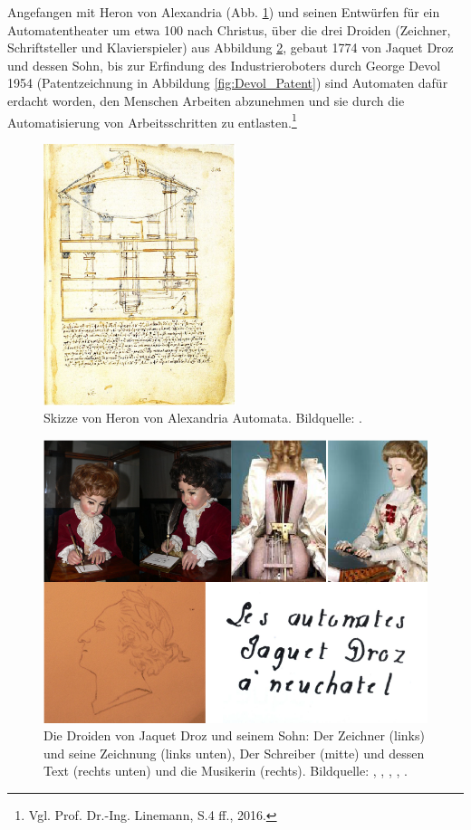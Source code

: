 Angefangen mit Heron von Alexandria (Abb. \ref{fig:Automata}) und seinen Entwürfen für ein Automatentheater um etwa 100 nach Christus, über die drei Droiden (Zeichner, Schriftsteller und Klavierspieler) aus Abbildung \ref{fig:jaquet}, gebaut 1774 von Jaquet Droz und dessen Sohn, bis zur Erfindung des Industrieroboters durch George Devol 1954 (Patentzeichnung in Abbildung \ref{fig:Devol_Patent}) sind Automaten dafür erdacht worden, den Menschen Arbeiten abzunehmen und sie durch die Automatisierung von Arbeitsschritten zu entlasten.\footnote{ Vgl. Prof. Dr.-Ing. Linemann, S.4 ff., 2016.}
\begin{figure}[H]
	\centering
	\includegraphics[width=0.5\textwidth]{figuren/Hero_of_Alexandria_Automata}
	\caption{Skizze von Heron von Alexandria \frqq Automata\flqq. Bildquelle: \cite{automata}.}
	\label{fig:Automata}
\end{figure}
\begin{figure}[H]
	\centering
	\includegraphics[width=1.\textwidth]{figuren/Jaquet}
	\caption{Die Droiden von Jaquet Droz und seinem Sohn: Der Zeichner (links) und seine Zeichnung (links unten), Der Schreiber (mitte) und dessen Text (rechts unten) und die Musikerin (rechts). Bildquelle: \cite{zeichner}, \cite{schreiber}, \cite{musikerin}, \cite{zeichnung}, \cite{text}.}
	\label{fig:jaquet}
\end{figure} 
